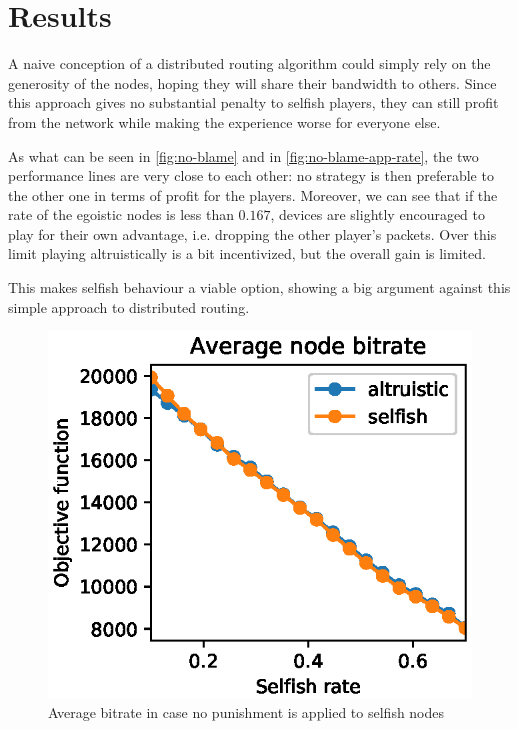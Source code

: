 \documentclass[conference,10.5pt]{IEEEtran}
\begin{document}
\section{Results} \label{sec:results}


A naive conception of a distributed routing algorithm could simply rely on the generosity of the nodes, hoping they will share their bandwidth to others.
Since this approach gives no substantial penalty to selfish players, they can still profit from the network while making the experience worse for everyone else.

As what can be seen in \autoref{fig:no-blame} and in \autoref{fig:no-blame-app-rate}, the two performance lines are very close to each other: no strategy is then  preferable to the other one in terms of profit for the players. Moreover, we can see that if the rate of the egoistic nodes is less than $0.167$, devices are slightly encouraged to play for their own advantage, i.e. dropping the other player's packets.
Over this limit playing altruistically is a bit incentivized, but the overall gain is limited.

This makes selfish behaviour a viable option, showing a big argument against this simple approach to distributed routing.

\begin{figure}[h]
  \includegraphics{figures/obj_func_vs_selfish_rate_no_punish.eps}
  \caption{Average bitrate in case no punishment is applied to selfish nodes}
  \label{fig:no-blame}
\end{figure}
\end{document}
